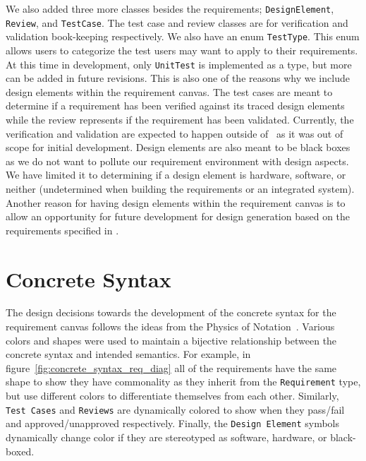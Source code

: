 We also added three more classes besides the requirements; \texttt{DesignElement}, \texttt{Review}, and \texttt{TestCase}. The test case and review classes are for verification and validation book-keeping respectively. We also have an enum \texttt{TestType}. This enum allows users to categorize the test users may want to apply to their requirements. At this time in development, only \texttt{UnitTest} is implemented as a type, but more can be added in future revisions. This is also one of the reasons why we include design elements within the requirement canvas. The test cases are meant to determine if a requirement has been verified against its traced design elements while the review represents if the requirement has been validated. Currently, the verification and validation are expected to happen outside of \tool\ as it was out of scope for initial development. Design elements are also meant to be black boxes as we do not want to pollute our requirement environment with design aspects. We have limited it to determining if a design element is hardware, software, or neither (undetermined when building the requirements or an integrated system). Another reason for having design elements within the requirement canvas is to allow an opportunity for future development for design generation based on the requirements specified in \tool. 


\section{Concrete Syntax}
\label{sec:Concrete_Syntax}

The design decisions towards the development of the concrete syntax for the requirement canvas follows the ideas from the Physics of Notation~\cite{5353439}. Various colors and shapes were used to maintain a bijective relationship between the concrete syntax and intended semantics. For example, in figure~\ref{fig:concrete_syntax_req_diag} all of the requirements have the same shape to show they have commonality as they inherit from the \texttt{Requirement} type, but use different colors to differentiate themselves from each other. Similarly, \texttt{Test Cases} and \texttt{Reviews} are dynamically colored to show when they pass/fail and approved/unapproved respectively. Finally, the \texttt{Design Element} symbols dynamically change color if they are stereotyped as software, hardware, or black-boxed.

